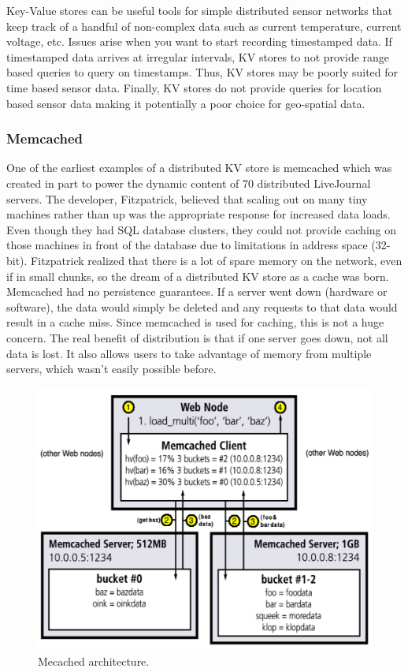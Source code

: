 \documentclass[]{article}
\begin{document}
Key-Value stores can be useful tools for simple distributed sensor networks that keep track of a handful of non-complex data such as current temperature, current voltage, etc. Issues arise when you want to start recording timestamped data. If timestamped data arrives at irregular intervals, KV stores to not provide range based queries to query on timestamps. Thus, KV stores may be poorly suited for time based sensor data. Finally, KV stores do not provide queries for location based sensor data making it potentially a poor choice for geo-spatial data.

\subsubsection{Memcached}
One of the earliest examples of a distributed KV store is memcached\cite{fitzpatrick_distributed_2004} which was created in part to power the dynamic content of 70 distributed LiveJournal servers. The developer, Fitzpatrick, believed that scaling out on many tiny machines rather than up was the appropriate response for increased data loads. Even though they had SQL database clusters, they could not provide caching on those machines in front of the database due to limitations in address space (32-bit). Fitzpatrick realized that there is a lot of spare memory on the network, even if in small chunks, so the dream of a distributed KV store as a cache was born. Memcached had no persistence guarantees. If a server went down (hardware or software), the data would simply be deleted and any requests to that data would result in a cache miss. Since memcached is used for caching, this is not a huge concern. The real benefit of distribution is that if one server goes down, not all data is lost. It also allows users to take advantage of memory from multiple servers, which wasn't easily possible before.

\begin{figure}
    \centering
    \includegraphics[width=1.0\linewidth]{img/memcached}
    \caption[Mecached architecture.]{Mecached architecture. \cite{fitzpatrick_distributed_2004}}
    \label{fig:memcached}
\end{figure}
\end{document}
